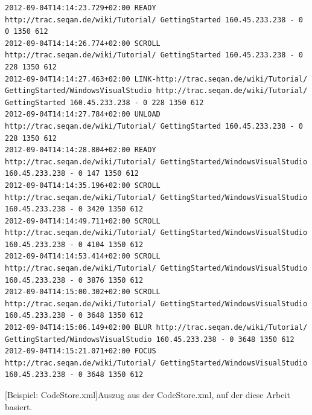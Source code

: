\documentclass[11pt,a4paper]{book}
\begin{document}
\begin{center}
\begin{verbatim}
2012-09-04T14:14:23.729+02:00 READY http://trac.seqan.de/wiki/Tutorial/ GettingStarted 160.45.233.238 - 0 0 1350 612
2012-09-04T14:14:26.774+02:00 SCROLL http://trac.seqan.de/wiki/Tutorial/ GettingStarted 160.45.233.238 - 0 228 1350 612
2012-09-04T14:14:27.463+02:00 LINK-http://trac.seqan.de/wiki/Tutorial/ GettingStarted/WindowsVisualStudio http://trac.seqan.de/wiki/Tutorial/ GettingStarted 160.45.233.238 - 0 228 1350 612
2012-09-04T14:14:27.784+02:00 UNLOAD http://trac.seqan.de/wiki/Tutorial/ GettingStarted 160.45.233.238 - 0 228 1350 612
2012-09-04T14:14:28.804+02:00 READY http://trac.seqan.de/wiki/Tutorial/ GettingStarted/WindowsVisualStudio 160.45.233.238 - 0 147 1350 612
2012-09-04T14:14:35.196+02:00 SCROLL http://trac.seqan.de/wiki/Tutorial/ GettingStarted/WindowsVisualStudio 160.45.233.238 - 0 3420 1350 612
2012-09-04T14:14:49.711+02:00 SCROLL http://trac.seqan.de/wiki/Tutorial/ GettingStarted/WindowsVisualStudio 160.45.233.238 - 0 4104 1350 612
2012-09-04T14:14:53.414+02:00 SCROLL http://trac.seqan.de/wiki/Tutorial/ GettingStarted/WindowsVisualStudio 160.45.233.238 - 0 3876 1350 612
2012-09-04T14:15:00.302+02:00 SCROLL http://trac.seqan.de/wiki/Tutorial/ GettingStarted/WindowsVisualStudio 160.45.233.238 - 0 3648 1350 612
2012-09-04T14:15:06.149+02:00 BLUR http://trac.seqan.de/wiki/Tutorial/ GettingStarted/WindowsVisualStudio 160.45.233.238 - 0 3648 1350 612
2012-09-04T14:15:21.071+02:00 FOCUS http://trac.seqan.de/wiki/Tutorial/ GettingStarted/WindowsVisualStudio 160.45.233.238 - 0 3648 1350 612
\end{verbatim}
[Beispiel: CodeStore.xml]{Auszug aus der CodeStore.xml, auf der diese Arbeit basiert.}
\label{lst:codestore-file}
\end{center}
\end{document}
